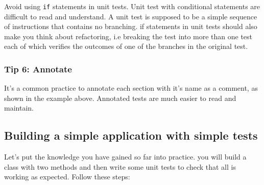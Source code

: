 \documentclass[
]{book}
\begin{document}
Avoid using \texttt{if} statements in unit tests. Unit test with conditional statements are difficult to read and understand. A unit test is supposed to be a simple sequence of instructions that contains no branching. if statements in unit tests should also make you think about refactoring, i.e breaking the test into more than one test each of which verifies the outcomes of one of the branches in the original test.

\hypertarget{annotate}{%
\subsubsection{Tip 6: Annotate}\label{annotate}}

It's a common practice to annotate each section with it's name as a comment, as shown in the example above. Annotated tests are much easier to read and maintain.

\hypertarget{simples}{%
\subsection{Building a simple application with simple tests}\label{simples}}

Let's put the knowledge you have gained so far into practice. you will build a class with two methods and then write some unit tests to check that all is working as expected. Follow these steps:
\end{document}
